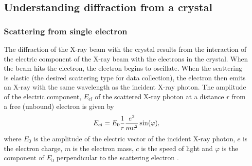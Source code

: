    \subsection{Understanding diffraction from a crystal}
    \label{sub:Understanding diffraction from a crystal}

        \subsubsection{Scattering from single electron}
        \label{subs:Scattering from single electron}
            The diffraction of the X-ray beam with the crystal results from the interaction of the electric component of the X-ray beam with the electrons in the crystal. When the beam hits the electron, the electron begins to oscillate. When the scattering is elastic (the desired scattering type for data collection), the electron then emits an X-ray with the same wavelength as the incident X-ray photon. The amplitude of the electric component, $E_{el}$ of the scattered X-ray photon at a distance $r$ from a free (unbound) electron is given by
            \begin{equation}
                E_{el} = E_0 \frac{1}{r}\frac{e^2}{mc^2} \sin(\varphi),
            \end{equation}
            where $E_0$ is the amplitude of the electric vector of the incident X-ray photon, $e$ is the electron charge, $m$ is the electron mass, $c$ is the speed of light and $\varphi$ is the component of $E_0$ perpendicular to the scattering electron \cite{drenth2012}.

